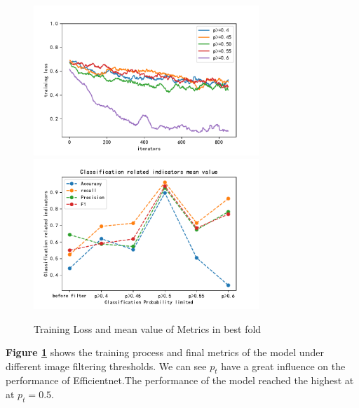 \documentclass[12pt]{article}
\begin{document}
\begin{figure}[H]%
	\small
	\centering
	\includegraphics[width=8.5cm]{./pictures/loss2.pdf}
	\includegraphics[width=8.5cm]{./pictures/acc.pdf}
	\caption{Training Loss and mean value of Metrics in best fold}\label{loss_acc_sensitivity}
\end{figure}
\textbf{Figure \ref{loss_acc_sensitivity}} shows the training process and final metrics of the model under different image filtering thresholds. We can see $p_t$ have a great influence on the performance of Efficientnet.The performance of the model reached the highest at at $p_t=0.5$.
\end{document}
